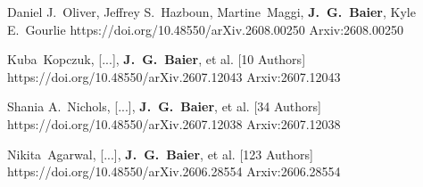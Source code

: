          {Daniel J.~{Oliver}, Jeffrey S.~{Hazboun}, Martine~{Maggi}, \textbf{J.~G.~{Baier}}, Kyle E.~{Gourlie}}
         {https://doi.org/10.48550/arXiv.2608.00250}
         {{Arxiv:}2608.00250}

         {Kuba~{Kopczuk}, [...], \textbf{J.~G.~{Baier}}, et al. [10 Authors]}
         {https://doi.org/10.48550/arXiv.2607.12043}
         {{Arxiv:}2607.12043}

         {Shania A.~{Nichols}, [...], \textbf{J.~G.~{Baier}}, et al. [34 Authors]}
         {https://doi.org/10.48550/arXiv.2607.12038}
         {{Arxiv:}2607.12038}

         {Nikita~{Agarwal}, [...], \textbf{J.~G.~{Baier}}, et al. [123 Authors]}
         {https://doi.org/10.48550/arXiv.2606.28554}
         {{Arxiv:}2606.28554}

